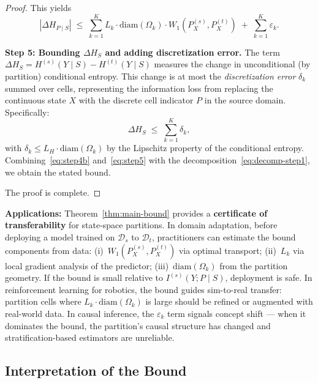 \documentclass[12pt,a4paper]{article}
\newcommand{\cD}{\mathcal{D}}
\newcommand{\Wass}{W_1}
\newcommand{\diam}{\mathrm{diam}}
\begin{document}
\begin{proof}
This yields
\begin{equation}\label{eq:step4b}
    |\Delta H_{P\mid S}| \;\leq\;
    \sum_{k=1}^{K} L_k\cdot\diam(\Omega_k)\cdot\Wass(P^{(s)}_X,P^{(t)}_X)
    \;+\; \sum_{k=1}^{K} \varepsilon_k.
\end{equation}

\medskip\noindent
\textbf{Step 5: Bounding $\Delta H_S$ and adding discretization error.}
The term $\Delta H_S = H^{(s)}(Y\mid S)-H^{(t)}(Y\mid S)$ measures the
change in unconditional (by partition) conditional entropy.  This change
is at most the \emph{discretization error} $\delta_k$ summed over cells,
representing the information loss from replacing the continuous state $X$
with the discrete cell indicator $P$ in the source domain.  Specifically:
\begin{equation}\label{eq:step5}
    \Delta H_S \;\leq\;
    \sum_{k=1}^{K} \delta_k,
\end{equation}
with $\delta_k \leq L_H\cdot\diam(\Omega_k)$ by the Lipschitz property of
the conditional entropy.  Combining~\eqref{eq:step4b} and~\eqref{eq:step5}
with the decomposition~\eqref{eq:decomp-step1}, we obtain the stated bound.

\medskip\noindent
The proof is complete.
\end{proof}

\medskip\noindent
\textbf{Applications:}
Theorem~\ref{thm:main-bound} provides a \textbf{certificate of
transferability} for state-space partitions.  In domain adaptation, before
deploying a model trained on $\cD_s$ to $\cD_t$, practitioners can estimate
the bound components from data: (i)~$\Wass(P^{(s)}_X,P^{(t)}_X)$ via
optimal transport; (ii)~$L_k$ via local gradient analysis of the predictor;
(iii)~$\diam(\Omega_k)$ from the partition geometry.  If the bound is small
relative to $I^{(s)}(Y;P\mid S)$, deployment is safe.  In reinforcement
learning for robotics, the bound guides sim-to-real transfer: partition cells
where $L_k\cdot\diam(\Omega_k)$ is large should be refined or augmented with
real-world data.  In causal inference, the $\varepsilon_k$ term signals
concept shift — when it dominates the bound, the partition's causal structure
has changed and stratification-based estimators are unreliable.

\subsection{Interpretation of the Bound}
\end{document}
